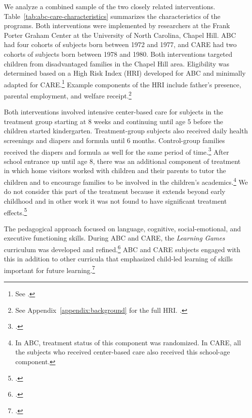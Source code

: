 We analyze a combined sample of the two closely related interventions. Table~\ref{tab:abc-care-characteristics} summarizes the characteristics of the programs. Both interventions were implemented by researchers at the Frank Porter Graham Center at the University of North Carolina, Chapel Hill. ABC had four cohorts of subjects born between 1972 and 1977, and CARE had two cohorts of subjects born between 1978 and 1980. Both interventions targeted children from disadvantaged families in the Chapel Hill area. Eligibility was determined based on a High Risk Index (HRI) developed for ABC and minimally adapted for CARE.\footnote{See \citet{Campbell_Wasik_etal_2008_ECRQ}.} Example components of the HRI include father's presence, parental employment, and welfare receipt.\footnote{See Appendix~\ref{appendix:background} for the full HRI. \citet{Ramey_Smith_1977_AJMD, Wasik_Ramey_etal_1990_CD, Ramey_Campbell_1991_childreninpoverty}.}

Both interventions involved intensive center-based care for subjects in the treatment group starting at 8 weeks and continuing until age 5 before the children started kindergarten. Treatment-group subjects also received daily health screenings and diapers and formula until 6 months. Control-group families received the diapers and formula as well for the same period of time.\footnote{\citet{Wasik_Ramey_etal_1990_CD}.}  After school entrance up until age 8, there was an additional component of treatment in which home visitors worked with children and their parents to tutor the children and to encourage families to be involved in the children's academics.\footnote{In ABC, treatment status of this component was randomized. In CARE, all the subjects who received center-based care also received this school-age component.} We do not consider this part of the treatment because it extends beyond early childhood and in other work it was not found to have significant treatment effects.\footnote{\citet{Campbell_Ramey_etal_2002_ADS}.}

The pedagogical approach focused on language, cognitive, social-emotional, and executive functioning skills. During ABC and CARE, the \textit{Learning Games} curriculum was developed and refined.\footnote{\citet{Sparling_Lewis_1979_BOOKLearninggamesFirstThree}.} ABC and CARE subjects engaged with this in addition to other curricula that emphasized child-led learning of skills important for future learning.\footnote{\citet{Conti_etal_2016_LongTermHealth}.}

